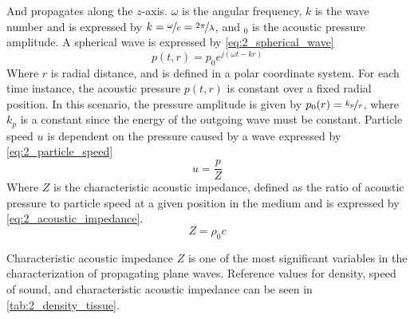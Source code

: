 And propagates along the $z$-axis. $\omega$ is the angular frequency, $k$ is the wave number and is expressed by $k=\nicefrac{\omega}{c}=\nicefrac{2\pi}{\lambda}$, and $_{0}$ is the acoustic pressure amplitude. A spherical wave is expressed by \cref{eq:2_spherical_wave}
\begin{equation} \label{eq:2_spherical_wave}
	p(t,r)=p_{0} e^{j(\omega t - k r)}
\end{equation}
Where $r$ is radial distance, and is defined in a polar coordinate system. For each time instance, the acoustic pressure $p(t,r)$ is constant over a fixed radial position. In this scenario, the pressure amplitude is given by $p_{0}(r) = \nicefrac{k_{p}}{r}$, where $k_{p}$ is a constant since the energy of the outgoing wave must be constant.  Particle speed $u$ is dependent on the pressure caused by a wave expressed by \cref{eq:2_particle_speed}
\begin{equation} \label{eq:2_particle_speed}
	u = \frac{p}{Z}
\end{equation}
Where $Z$ is the characteristic acoustic impedance, defined as the ratio of acoustic pressure to particle speed at a given position in the medium and is expressed by \cref{eq:2_acoustic_impedance}.
\begin{equation} \label{eq:2_acoustic_impedance}
	Z = \rho_{0} c
\end{equation}

Characteristic acoustic impedance $Z$ is one of the most significant variables in the characterization of propagating plane waves. Reference values for density, speed of sound, and characteristic acoustic impedance can be seen in \cref{tab:2_density_tissue}.

